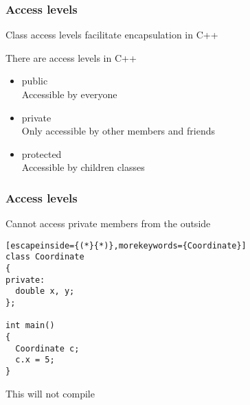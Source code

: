 \documentclass[14pt,a4paper,dvipsnames,usenames]{beamer}
\begin{document}
\begin{frame}
  \frametitle{Access levels}

  Class access levels facilitate encapsulation in C++

  \vspace{.5em}
  There are \: access levels in C++

  \vspace{.5em}
  \begin{itemize}
    \setlength\itemsep{.5em}
    \item public\\
      {\fontsize{12pt}{12pt}\selectfont Accessible by everyone}
    \item private\\
      {\fontsize{12pt}{12pt}\selectfont Only accessible by other members and friends}
    \item protected\\
      {\fontsize{12pt}{12pt}\selectfont Accessible by children classes}
  \end{itemize}
  
\end{frame}

\begin{frame}[fragile]
  \frametitle{Access levels}

  Cannot access private members from the outside

  \vspace{.5em}
  \begin{lstlisting}[escapeinside={(*}{*)},morekeywords={Coordinate}]
class Coordinate
{
private:
  double x, y;
};

int main()
{
  Coordinate c;
  c.x = 5;
}
  \end{lstlisting}

  \vspace{.5em}
  {\color{Marty}This will not compile}
  
\end{frame}
\end{document}
